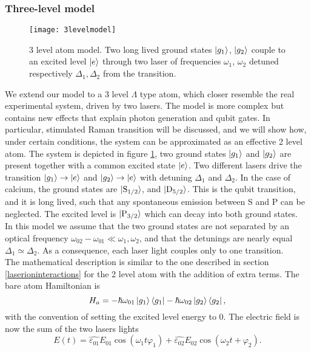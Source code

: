 \subsubsection{Three-level model}
\label{sec:threelevel}
\begin{figure}
\centering
\texttt{[image: 3levelmodel]}
\caption{3 level atom model. Two long lived ground states $\ket{g_1}$, $\ket{g_2}$ couple to an excited level $\ket{e}$ through two laser of frequencies $\omega_1$, $\omega_2$ detuned respectively $\Delta_1,\Delta_2$ from the transition.}
\label{3levelmodel}
\end{figure}
We extend our model to a 3 level $\Lambda$ type atom, which closer resemble the real experimental system, driven by two lasers. The model is more complex but contains new effects that explain photon generation and qubit gates. In particular, stimulated Raman transition will be discussed, and we will show how, under certain conditions, the system can be approximated as an effective 2 level atom. The system is depicted in figure \ref{3levelmodel}, two ground states $\ket{g_1}$ and $\ket{g_2}$ are present together with a common excited state $\ket{e}$. Two different lasers drive the transition $\ket{g_1} \to \ket{e}$ and $\ket{g_2} \to \ket{e}$ with detuning $\Delta_1$ and $\Delta_2$. In the case of calcium, the ground states are $\ket{\text{S}_{1/2}}$, and $\ket{\text{D}_{5/2}}$. This is the qubit transition, and it is long lived, such that any spontaneous emission between S and P can be neglected. The excited level is $\ket{\text{P}_{3/2}}$ which can decay into both ground states.\\
In this model we assume that the two ground states are not separated by an optical frequency $\omega_{02} - \omega_{01} \ll \omega_1,\omega_2$, and that the detunings are nearly equal $\Delta_1 \simeq \Delta_2$. As a consequence, each laser light couples only to one transition.\\
The mathematical description is similar to the one described in section \ref{laserioninteractions} for the 2 level atom with the addition of extra terms. The bare atom Hamiltonian is
\begin{equation}
H_a = -\hbar \omega_{01}\ket{g_1}\bra{g_1} - \hbar \omega_{02}\ket{g_2}\bra{g_2},
\end{equation}
with the convention of setting the excited level energy to 0. The electric field is now the sum of the two lasers lights
\begin{equation}
E(t) = \hat{\varepsilon_{01}} E_{01} \cos(\omega_{1} t \varphi_1) + \hat{\varepsilon_{02}} E_{02} \cos(\omega_2 t + \varphi_2).
\end{equation}

